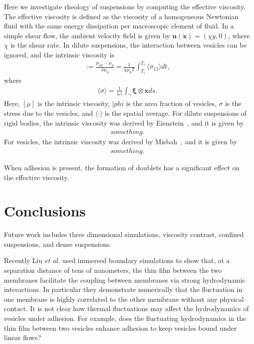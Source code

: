 \documentclass[%
preprint,
 amsmath,amssymb,
 aps,
]{revtex4-1}
\newcommand{\uu}{\mathbf{u}}
\newcommand{\xx}{\mathbf{x}}
\newcommand{\xxi}{\boldsymbol{\xi}}
\begin{document}
Here we investigate rheology of suspensions by computing the effective
viscosity. The effective viscosity is defined as the viscosity of a
homogeneous Newtonian fluid with the same energy dissipation per
macroscopic element of fluid.  In a simple shear flow, the ambient
velocity field is given by $\uu(\xx) = (\chi y,0)$, where $\chi$ is the
shear rate.  In dilute suspensions, the interaction between vesicles can
be ignored, and the intrinsic viscosity is
\begin{align*}
  [\mu]:= \frac{\mu_{\mathrm{eff}} - \mu_0}{\phi \mu_0} = 
  \frac{1}{\chi \mu_0 T} \int_{T_i}^{T_e} 
  \langle \sigma_{12} \rangle dt,
\end{align*}
where
\begin{align*}
  \langle \sigma \rangle = \frac{1}{|\omega|} \int_{\gamma}
    \xxi \otimes \xx ds.
\end{align*}
Here, $[\mu]$ is the intrinsic viscosity, $|phi$ is the area fraction of
vesicles, $\sigma$ is the stress due to the vesicles, and $\langle \cdot
\rangle$ is the spatial average.  For dilute suspensions of rigid
bodies, the intrinsic viscosity was derived by Eienstein~\cite{}, and it
is given by
\begin{align*}
  something.
\end{align*}
For vesicles, the intrinsic viscosity was derived by Misbah~\cite{}, and
it is given by
\begin{align*}
  something.
\end{align*}

When adhesion is present, the formation of doublets has a significant
effect on the effective viscosity.




\section{Conclusions}

Future work includes three dimensional simulations, viscosity contrast,
confined suspensions, and dense suspensions.

Recently Liu {\it et al.} \cite{LiuChuNewbyRead2018_bioRxiv} used immersed boundary simulations to show that, 
at a separation distance of tens of nanometers,
the thin film between the two membranes facilitate the coupling between membranes via strong hydrodynamic interactions. In particular they demonstrate
numerically that the fluctuation in one membrane is highly correlated to the other membrane without any physical contact. It is not clear how thermal fluctuations may affect the hydrodynamics of vesicles under adhesion. For example, does the fluctuating hydrodynamics in the thin film between two vesicles enhance adhesion to keep vesicles bound under linear flows?
\end{document}
